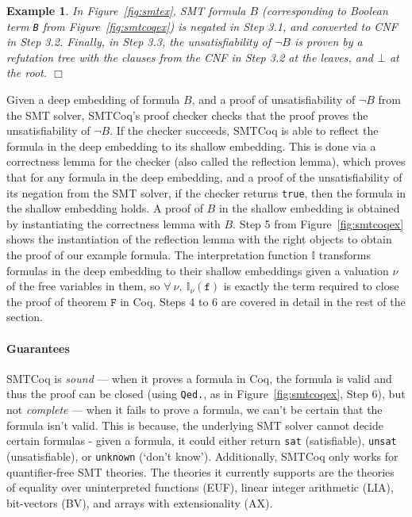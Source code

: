 \documentclass[11pt]{article}
\newtheorem{example}{Example}[section]
\begin{document}
	\begin{example} 
		\em In Figure~\ref{fig:smtex}, 
		SMT formula $B$ (corresponding
		to Boolean term \texttt{B}
		from Figure~\ref{fig:smtcoqex}) is 
		negated in Step 3.1, and converted 
		to CNF in Step 3.2.
		Finally, in Step 3.3, the 
		unsatisfiability of $\neg B$ is 
		proven by a refutation tree with 
		the clauses from the CNF in Step 3.2
		at the leaves, and $\bot$ at the 
		root. \hfill $\Box$
	\end{example}

	Given a deep embedding of 
	formula $B$, and a proof of 
	unsatisfiability of $\neg B$
	from the SMT solver, SMTCoq's proof 
	checker checks that the proof proves
	the unsatisfiability of $\neg B$. If the 
	checker succeeds, SMTCoq is able to 
	reflect the formula in 
	the deep embedding to its shallow 
	embedding. This is done via a 
	correctness lemma for the checker
	(also called the reflection lemma),
	which proves that for any 
	formula in the deep embedding, and 
	a proof of the unsatisfiability of its 
	negation from the SMT solver, if 
	the checker returns \texttt{true}, 
	then the formula in 
	the shallow embedding holds. A 
	proof of $B$ in the shallow 
	embedding is obtained by instantiating 
	the correctness lemma with $B$.
	Step 5 from Figure~\ref{fig:smtcoqex} 
	shows the instantiation of 
	the reflection lemma with 
	the right objects to obtain the 
	proof of our example formula. 
	The interpretation function
	$\mathbb{I}$ transforms 
	formulas in the deep embedding
	to their shallow embeddings
	given a valuation $\nu$ of the 
	free variables in them, so 
	$\forall\ \nu,\ 
	\mathbb{I}_{\nu}(\texttt{f})$
	is exactly the term required 
	to close the proof of 
	theorem $\texttt{F}$
	in Coq. Steps 4 to 6 are covered
	in detail in the rest of the section.
	
	\paragraph{Guarantees}
	SMTCoq is \textit{sound} ---
	when it proves a formula in Coq, the 
	formula is valid and thus the proof
	can be closed (using \texttt{Qed.},
	as in Figure~\ref{fig:smtcoqex}, 
	Step 6), but 
	not \textit{complete} --- when it 
	fails to prove a formula, we can't 
	be certain that the formula isn't 
	valid. This is because, the underlying 
	SMT solver cannot decide certain 
	formulas - given a formula, it could 
	either return \texttt{sat} 
	(satisfiable), \texttt{unsat} 
	(unsatisfiable), or 
	\texttt{unknown} (`don't know').
	Additionally, SMTCoq only works for 
	quantifier-free SMT theories. The 
	theories it currently supports 
	are the theories of equality over
	uninterpreted functions (EUF), 
	linear integer arithmetic (LIA),
	bit-vectors (BV), and arrays with
	extensionality (AX).
	
\end{document}

